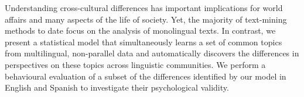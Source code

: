 Understanding cross-cultural differences has important implications for world affairs and many aspects of the life of society. Yet, the majority of text-mining methods to date focus on the analysis of monolingual texts. In contrast, we present a statistical model that simultaneously learns a set of common topics from multilingual, non-parallel data and automatically discovers the differences in perspectives on these topics across linguistic communities. We perform a behavioural evaluation of a subset of the differences identified by our model in English and Spanish to investigate their psychological validity.
